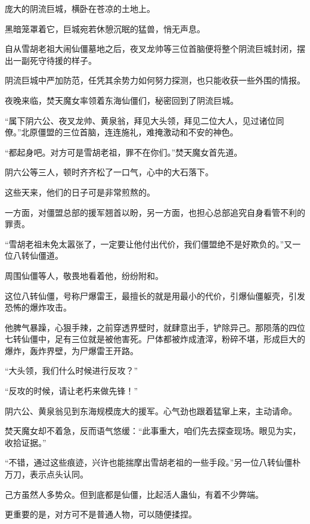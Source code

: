 
\begin{this_body}



庞大的阴流巨城，横卧在苍凉的土地上。

黑暗笼罩着它，巨城宛若休憩沉眠的猛兽，悄无声息。

自从雪胡老祖大闹仙僵墓地之后，夜叉龙帅等三位首脑便将整个阴流巨城封闭，摆出一副死守待援的样子。

阴流巨城中严加防范，任凭其余势力如何努力探测，也只能收获一些外围的情报。

夜晚来临，焚天魔女率领着东海仙僵们，秘密回到了阴流巨城。

“属下阴六公、夜叉龙帅、黄泉翁，拜见大头领，拜见二位大人，见过诸位同僚。”北原僵盟的三位首脑，连连施礼，难掩激动和不安的神色。

“都起身吧。对方可是雪胡老祖，罪不在你们。”焚天魔女首先道。

阴六公等三人，顿时齐齐松了一口气，心中的大石落下。

这些天来，他们的日子可是非常煎熬的。

一方面，对僵盟总部的援军翘首以盼，另一方面，也担心总部追究自身看管不利的罪责。

“雪胡老祖未免太嚣张了，一定要让他付出代价，我们僵盟绝不是好欺负的。”又一位八转仙僵道。

周围仙僵等人，敬畏地看着他，纷纷附和。

这位八转仙僵，号称尸爆雷王，最擅长的就是用最小的代价，引爆仙僵躯壳，引发恐怖的爆炸攻击。

他脾气暴躁，心狠手辣，之前穿透界壁时，就肆意出手，铲除异己。那陨落的四位七转仙僵中，足有三位就是被他害死。尸体都被炸成渣滓，粉碎不堪，形成巨大的爆炸，轰炸界壁，为尸爆雷王开路。

“大头领，我们什么时候进行反攻？”

“反攻的时候，请让老朽来做先锋！”

阴六公、黄泉翁见到东海规模庞大的援军。心气劲也跟着猛窜上来，主动请命。

焚天魔女却不着急，反而语气悠缓：“此事重大，咱们先去探查现场。眼见为实，收拾证据。”

“不错，通过这些痕迹，兴许也能揣摩出雪胡老祖的一些手段。”另一位八转仙僵朴万刀，表示点头认同。

己方虽然人多势众。但到底都是仙僵，比起活人蛊仙，有着不少弊端。

更重要的是，对方可不是普通人物，可以随便揉捏。


\end{this_body}
